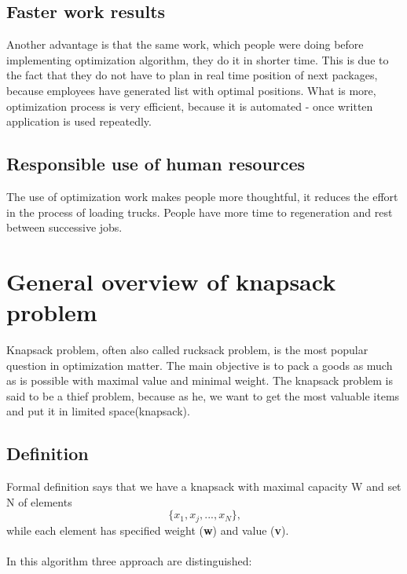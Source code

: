\documentclass[conference,compsoc]{IEEEtran}
\begin{document}
\subsection{Faster work results}
Another advantage is that the same work, which people were doing before implementing optimization algorithm, they do it in shorter time. This is due to the fact that they do not have to plan in real time position of next packages, because employees have generated list with optimal positions. What is more, optimization process is very efficient, because it is automated - once written application is used repeatedly.

\subsection{Responsible use of human resources}
The use of optimization work makes people more thoughtful, it reduces the effort in the process of loading trucks. People have more time to regeneration and rest between successive jobs.

\section{General overview of knapsack problem}
Knapsack problem, often also called rucksack problem, is the most popular question in optimization matter. The main objective is to pack a goods as much as is possible with maximal value and minimal weight. The knapsack problem is said to be a thief problem, because as he, we want to get the most valuable items and put it in limited space(knapsack).

\subsection{Definition}
Formal definition says that we have a knapsack with maximal capacity W and set N of elements 
$$ \{x_1,x_j,...,x_N\} \textrm{,}$$
while each element has specified weight (\textbf{w}) and value (\textbf{v}).\\\\
 
In this algorithm three approach are distinguished:
\end{document}

